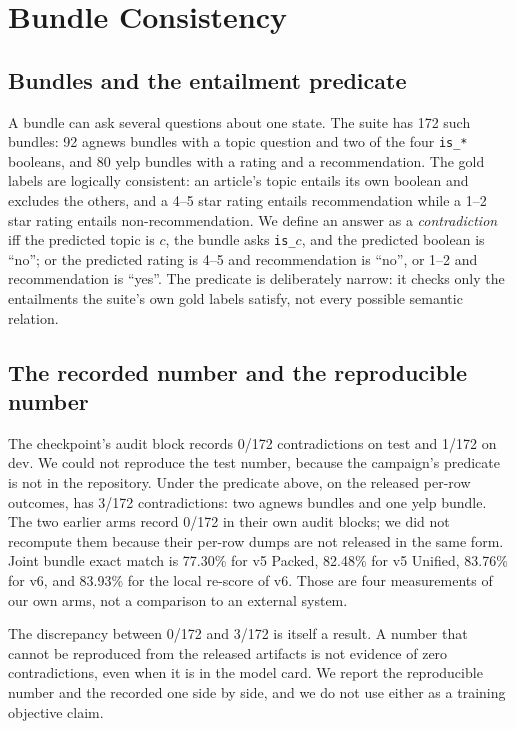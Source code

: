 \section{Bundle Consistency}
\label{sec:consistency}

\subsection{Bundles and the entailment predicate}
A bundle can ask several questions about one state. The suite has 172 such bundles: 92 agnews bundles with a topic question and two of the four \texttt{is\_*} booleans, and 80 yelp bundles with a rating and a recommendation. The gold labels are logically consistent: an article's topic entails its own boolean and excludes the others, and a 4--5 star rating entails recommendation while a 1--2 star rating entails non-recommendation. We define an answer as a \emph{contradiction} iff the predicted topic is $c$, the bundle asks \texttt{is\_$c$}, and the predicted boolean is “no”; or the predicted rating is 4--5 and recommendation is “no”, or 1--2 and recommendation is “yes”. The predicate is deliberately narrow: it checks only the entailments the suite's own gold labels satisfy, not every possible semantic relation.

\subsection{The recorded number and the reproducible number}
The checkpoint's audit block records 0/172 contradictions on test and 1/172 on dev. We could not reproduce the test number, because the campaign's predicate is not in the repository. Under the predicate above, on the released per-row outcomes, \vsix{} has 3/172 contradictions: two agnews bundles and one yelp bundle. The two earlier arms record 0/172 in their own audit blocks; we did not recompute them because their per-row dumps are not released in the same form. Joint bundle exact match is 77.30\% for v5 Packed, 82.48\% for v5 Unified, 83.76\% for v6, and 83.93\% for the local re-score of v6. Those are four measurements of our own arms, not a comparison to an external system.

The discrepancy between 0/172 and 3/172 is itself a result. A number that cannot be reproduced from the released artifacts is not evidence of zero contradictions, even when it is in the model card. We report the reproducible number and the recorded one side by side, and we do not use either as a training objective claim.

